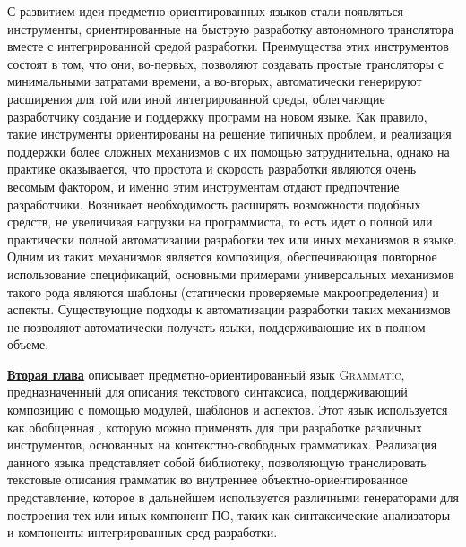 \documentclass[12pt,a4paper]{article}
\newcommand{\tool}[1]{\textsc{#1}}
\theoremstyle{definition}
\theoremstyle{plain}
\newcommand{\GRM}{\tool{Grammatic}}
\newcommand{\afsubsection}[1]{\par \underline{\textbf{#1}}}
\begin{document}
С развитием идеи предметно-ориентированных языков стали появляться инструменты, ориентированные на быструю разработку автономного транслятора вместе с интегрированной средой разработки. Преимущества этих инструментов состоят в том, что они, во-первых, позволяют создавать простые трансляторы с минимальными затратами времени, а во-вторых, автоматически генерируют расширения для той или иной интегрированной среды, облегчающие разработчику создание и поддержку программ на новом языке. Как правило, такие инструменты ориентированы на решение типичных проблем, и реализация поддержки более сложных механизмов с их помощью затруднительна, однако на практике оказывается, что простота и скорость разработки являются очень весомым фактором, и именно этим инструментам отдают предпочтение разработчики. Возникает необходимость расширять возможности подобных средств, не увеличивая нагрузки на программиста, то есть идет о полной или практически полной автоматизации разработки тех или иных механизмов в языке. Одним из таких механизмов является композиция, обеспечивающая повторное использование спецификаций, основными примерами универсальных механизмов такого рода являются шаблоны (статически проверяемые макроопределения) и аспекты. Существующие подходы к автоматизации разработки таких механизмов не позволяют автоматически получать языки, поддерживающие их в полном объеме.

\afsubsection{Вторая глава} описывает предметно-ориентированный язык \GRM{}, предназначенный для описания текстового синтаксиса, поддерживающий композицию с помощью модулей, шаблонов и аспектов. Этот язык используется как обобщенная 
, которую можно применять для при разработке различных инструментов, основанных на контекстно-свободных грамматиках. Реализация данного языка представляет собой библиотеку, позволяющую транслировать текстовые описания грамматик во внутреннее объектно-ориентированное представление, которое в дальнейшем используется различными генераторами для построения тех или иных компонент ПО, таких как синтаксические анализаторы и компоненты интегрированных сред разработки.
\end{document}
